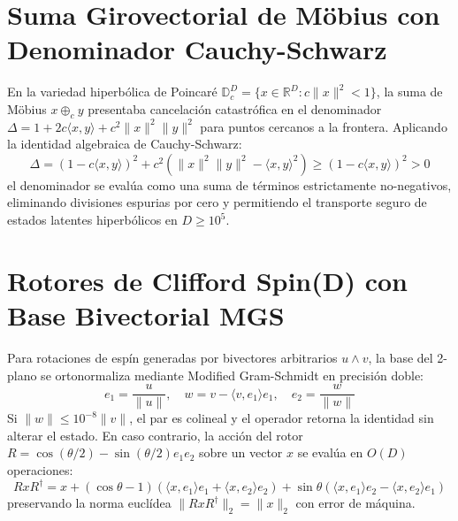 \section{Suma Girovectorial de Möbius con Denominador Cauchy-Schwarz}
En la variedad hiperbólica de Poincaré $\mathbb{D}_c^D = \{x \in \mathbb{R}^D : c\|x\|^2 < 1\}$, la suma de Möbius $x \oplus_c y$ presentaba cancelación catastrófica en el denominador $\Delta = 1 + 2c\langle x, y\rangle + c^2\|x\|^2\|y\|^2$ para puntos cercanos a la frontera.
Aplicando la identidad algebraica de Cauchy-Schwarz:
\begin{equation}
\Delta = (1 - c\langle x, y\rangle)^2 + c^2 \left( \|x\|^2 \|y\|^2 - \langle x, y\rangle^2 \right) \ge (1 - c\langle x, y\rangle)^2 > 0
\end{equation}
el denominador se evalúa como una suma de términos estrictamente no-negativos, eliminando divisiones espurias por cero y permitiendo el transporte seguro de estados latentes hiperbólicos en $D \ge 10^5$.

\section{Rotores de Clifford Spin(D) con Base Bivectorial MGS}
Para rotaciones de espín generadas por bivectores arbitrarios $u \wedge v$, la base del 2-plano se ortonormaliza mediante Modified Gram-Schmidt en precisión doble:
\begin{equation}
e_1 = \frac{u}{\|u\|}, \quad w = v - \langle v, e_1\rangle e_1, \quad e_2 = \frac{w}{\|w\|}
\end{equation}
Si $\|w\| \le 10^{-8}\|v\|$, el par es colineal y el operador retorna la identidad sin alterar el estado. En caso contrario, la acción del rotor $R = \cos(\theta/2) - \sin(\theta/2) e_1 e_2$ sobre un vector $x$ se evalúa en $O(D)$ operaciones:
\begin{equation}
R x R^\dagger = x + (\cos\theta - 1)(\langle x, e_1\rangle e_1 + \langle x, e_2\rangle e_2) + \sin\theta(\langle x, e_1\rangle e_2 - \langle x, e_2\rangle e_1)
\end{equation}
preservando la norma euclídea $\|R x R^\dagger\|_2 = \|x\|_2$ con error de máquina.

